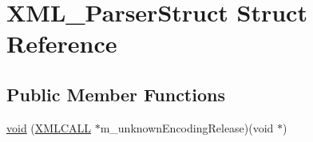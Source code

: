 \hypertarget{struct_x_m_l___parser_struct}{}\section{X\+M\+L\+\_\+\+Parser\+Struct Struct Reference}
\label{struct_x_m_l___parser_struct}
\subsection*{Public Member Functions}
\begin{DoxyCompactItemize}
\item 
\hyperlink{struct_x_m_l___parser_struct_a3cf000bdbc145bf39b502cd6ba0b6bc7}{void} (\hyperlink{expat__external_8h_aad85d290912c3ffed7a2ec0b6173dad3}{X\+M\+L\+C\+A\+LL} $\ast$m\+\_\+unknown\+Encoding\+Release)(void $\ast$)
\end{DoxyCompactItemize}
